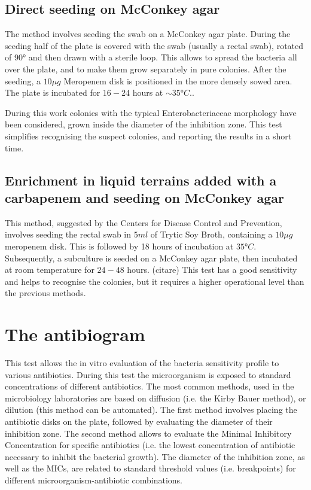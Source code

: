 \documentclass[11pt]{report}
\begin{document}
\subsection{Direct seeding on McConkey agar}
The method involves seeding the swab on a McConkey agar plate.
During the seeding half of the plate is covered  with the swab (usually a rectal swab), rotated of 90° and then drawn with a sterile loop. 
This allows to spread the bacteria all over the plate, and to make them grow separately in pure colonies.
After the seeding, a $10\mu g$ Meropenem disk is positioned in the more densely sowed area.
The plate is incubated for $16-24$ hours at $\sim 35°C$..

During this work colonies with the typical Enterobacteriaceae morphology have been considered, grown inside the diameter of the inhibition zone.
This test simplifies recognising the suspect colonies, and reporting the results in a short time. 

\subsection{Enrichment in liquid terrains added with a carbapenem and seeding on McConkey agar}

This method, suggested by the Centers for Disease Control and Prevention, involves seeding the rectal swab in $5ml$ of Trytic Soy Broth, containing a $10\mu g$ meropenem disk.
This is followed by 18 hours of incubation at $35°C$.
Subsequently, a subculture is seeded on a McConkey agar plate, then incubated at room temperature for $24-48$ hours. (citare)
This test has a good sensitivity and helps to recognise the colonies, but it requires a higher operational level than the previous methods.

\section{The antibiogram}
This test allows the in vitro evaluation of the bacteria sensitivity profile to various antibiotics.
During this test the microorganism is exposed to standard concentrations of different antibiotics.
The most common methods, used in the microbiology laboratories are based on diffusion (i.e. the Kirby Bauer method), or dilution (this method can be automated).
The first method involves placing the antibiotic disks on the plate, followed by evaluating the diameter of their inhibition zone. 
The second method allows to evaluate the Minimal Inhibitory Concentration for specific antibiotics (i.e. the lowest concentration of antibiotic necessary to inhibit the bacterial growth).
The diameter of the inhibition zone, as well as the MICs, are related to standard threshold values (i.e. breakpoints) for different microorganism-antibiotic combinations.
\end{document}
